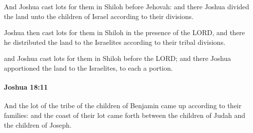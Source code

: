 			\begin{versebox}
					\item[BHS] 
					\item[ASV] And Joshua cast lots for them in Shiloh before Jehovah: and there Joshua divided the land unto the children of Israel according to their divisions.
					\item[NIV] Joshua then cast lots for them in Shiloh in the presence of the LORD, and there he distributed the land to the Israelites according to their tribal divisions.
					\item[NRSV] and Joshua cast lots for them in Shiloh before the LORD; and there Joshua apportioned the land to the Israelites, to each a portion.
			\end{versebox}

		\paragraph{Joshua 18:11} %
			\label{JOSHUA-18-11}

			And the lot of the tribe of the children of Benjamin came up according to their families: and the coast of their lot came forth between the children of Judah and the children of Joseph.

